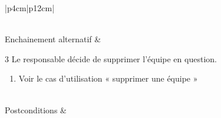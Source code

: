 \begin{longtable}{|p{4cm}|p{12cm}|}
\begin{minipage}[t]{\linewidth}
\begin{enumerate}[itemindent=0pt, leftmargin=*, nosep,before=\vspace{-0.5\baselineskip},after=\vspace{0.2\baselineskip}]
                                \end{enumerate}
                            \end{minipage}
                        \\
                        \hline
                        Enchainement alternatif & 
                            \begin{minipage}[t]{\linewidth}
                            3 Le responsable décide de supprimer l'équipe en question.
                                \begin{enumerate}[ nosep,after=\strut, ]
                                \item Voir le cas d'utilisation « supprimer une équipe »  
                                \end{enumerate}
                            \end{minipage}
                        \\
                        
                        \hline
                        Postconditions &   \\
                        \hline
                    \caption{Description du cas d'utilisation « Consulter le résumé d'une équipe »}\\
            \end{longtable}

